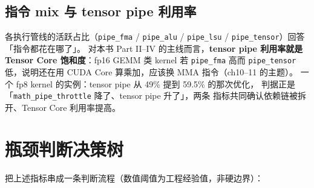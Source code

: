 \subsection{指令 mix 与 tensor pipe 利用率}

各执行管线的活跃占比（\texttt{pipe\_fma} / \texttt{pipe\_alu} /
\texttt{pipe\_lsu} / \texttt{pipe\_tensor}）回答「指令都花在哪了」。
对本书 Part II--IV 的主线而言，\textbf{tensor pipe 利用率就是 Tensor Core
饱和度}：fp16 GEMM 类 kernel 若 \texttt{pipe\_fma} 高而 \texttt{pipe\_tensor}
低，说明还在用 CUDA Core 算乘加，应该换 MMA 指令（ch10--11 的主题）。
一个 fp8 kernel 的实例：tensor pipe 从 49\% 提到 59.5\% 的那次优化，
判据正是「\texttt{math\_\allowbreak{}pipe\_\allowbreak{}throttle} 降了、tensor pipe 升了」，两条
指标共同确认依赖链被拆开、Tensor Core 利用率提高。

\section{瓶颈判断决策树}\label{sec:ch00-tree}

把上述指标串成一条判断流程（数值阈值为工程经验值，非硬边界）：


